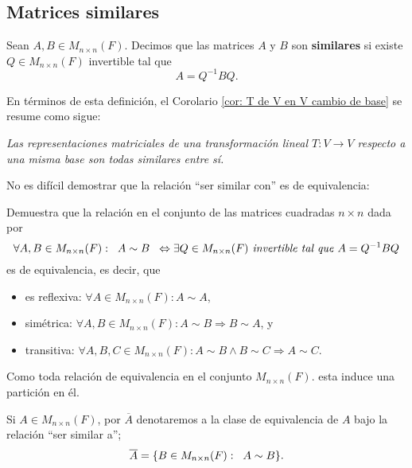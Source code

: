 \subsection{Matrices similares}

\begin{defi}
	\label{def: matrices similares}
Sean $A, B \in M_{n \times n}(F)$. Decimos que las matrices $A$ y $B$
son \textbf{similares} si existe $Q \in M_{n \times n}(F)$ invertible tal que
\[
A = Q^{-1}B Q.
\]
\end{defi}
En términos de esta definición, el Corolario 
\ref{cor: T de V en V cambio de base} se resume como sigue:
\begin{center}
\textit{Las representaciones matriciales de una transformación lineal
$T: V \longrightarrow V$ respecto a una misma base son todas similares entre
sí.}
\end{center}
No es difícil demostrar que la relación ``ser similar con''
es de equivalencia:

\noindent
{} Demuestra que la relación en el conjunto
de las matrices cuadradas $n \times n$ dada por
\begin{equation}
	\label{eq: relacion equiv ser similar a}
\forall A, B \in M_{n \times n}(F): \hspace{0.2cm}
A \sim B \hspace{0.2cm} \Leftrightarrow
\exists Q \in M_{n \times n}(F) \textit{ invertible tal que }
A = Q^{-1}B Q
\end{equation}
es de equivalencia, es decir, que 
\begin{itemize}
	\item es reflexiva: $\forall A \in M_{n \times n}(F): A \sim A$,
	\item simétrica: $\forall A, B \in M_{n \times n}(F): A \sim B
	\Rightarrow B \sim A$, y
	\item transitiva: $\forall A, B, C \in M_{n \times n}(F):
	A \sim B \wedge B \sim C \Rightarrow A \sim C$.
\end{itemize}

Como toda relación de equivalencia
en el conjunto $M_{n \times n}(F)$.
esta induce una partición
en él. 

\begin{notacion}
	Si $A \in M_{n \times n}(F)$, por $\overline{A}$
	denotaremos a la clase de equivalencia de $A$ bajo la relación
	``ser similar a'';
	\[
	\overline{A} = \{ B \in M_{n \times n}(F) : \hspace{0.2cm} 
	A \sim B
	\}.
	\]
\end{notacion}


